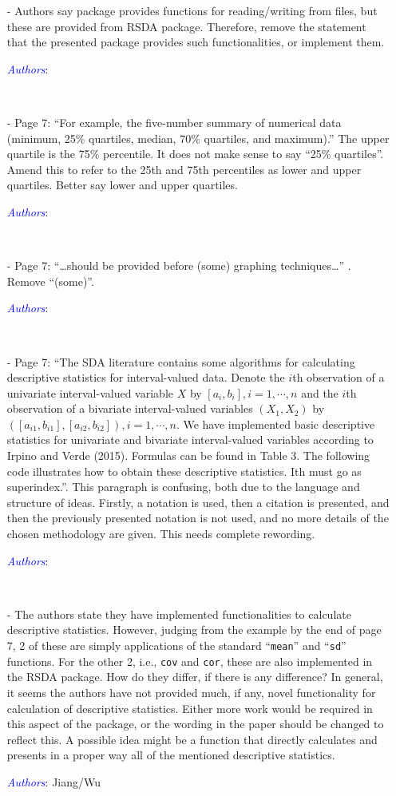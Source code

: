 \documentclass[11pt]{article}
\newcommand{\authors}[1]{

 \parbox{15cm}{\textcolor{blue}{\it Authors}: \color{red}#1}
 \\ \vspace{0.3cm}
}
\begin{document}
\begin{itemize}
\item[-] Authors say package provides functions for reading/writing from files, but these are provided from RSDA package. Therefore, remove the statement that the presented package provides such functionalities, or implement them. 
\authors{

}


\item[-] Page 7: “For example, the five-number summary of numerical data (minimum, 25\% quartiles, median, 70\% quartiles, and maximum).” The upper quartile is the 75\% percentile. It does not make sense to say “25\% quartiles”. Amend this to refer to the 25th and 75th percentiles as lower and upper quartiles. Better say lower and upper quartiles. 
\authors{

}


\item[-] Page 7: “…should be provided before (some) graphing techniques…” . Remove “(some)”. 
\authors{

}


\item[-] Page 7: “The SDA literature contains some algorithms for calculating descriptive statistics for interval-valued data. 
Denote the $i$th observation of a univariate interval-valued variable $X$ by $[a_i, b_i], i=1, \cdots, n$ and the 
$i$th observation of a bivariate interval-valued variables $(X_1, X_2)$ by  $([a_{i1}, b_{i1}], [a_{i2}, b_{i2}]), i=1, \cdots, n$. 
We have implemented basic descriptive statistics for univariate and bivariate interval-valued variables according to Irpino and Verde (2015). Formulas can be found in Table 3. The following code illustrates how to obtain these descriptive statistics. Ith must go as superindex.”. This paragraph is confusing, both due to the language and structure of ideas. Firstly, a notation is used, then a citation is presented, and then the previously presented notation is not used, and no more details of the chosen methodology are given. This needs complete rewording. 
\authors{

}


\item[-] The authors state they have implemented functionalities to calculate descriptive statistics. However, judging from the example by the end of page 7, 2 of these are simply applications of the standard “{\tt mean}” and “{\tt sd}” functions. For the other 2, i.e., {\tt cov} and {\tt cor}, these are also implemented in the RSDA package. How do they differ, if there is any difference? In general, it seems the authors have not provided much, if any, novel functionality for calculation of descriptive statistics. Either more work would be required in this aspect of the package, or the wording in the paper should be changed to reflect this. A possible idea might be a function that directly calculates and presents in a proper way all of the mentioned descriptive statistics. 
\authors{Jiang/Wu

}
\end{itemize}
\end{document}
